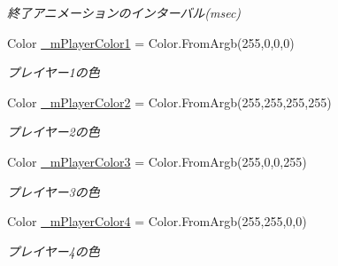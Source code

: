 \begin{DoxyCompactItemize}
\begin{DoxyCompactList}\small\item\em 終了アニメーションのインターバル(msec) \end{DoxyCompactList}\item 
\mbox{\label{class_reversi4color_wpf_1_1_reversi_setting_ab939e1084da7af7ae0db833db4be1ecd}} 
Color \hyperlink{class_reversi4color_wpf_1_1_reversi_setting_ab939e1084da7af7ae0db833db4be1ecd}{\+\_\+m\+Player\+Color1} = Color.\+From\+Argb(255,0,0,0)
\begin{DoxyCompactList}\small\item\em プレイヤー1の色 \end{DoxyCompactList}\item 
\mbox{\label{class_reversi4color_wpf_1_1_reversi_setting_ab56048d4d5e06451d7ae735c60fa3a64}} 
Color \hyperlink{class_reversi4color_wpf_1_1_reversi_setting_ab56048d4d5e06451d7ae735c60fa3a64}{\+\_\+m\+Player\+Color2} = Color.\+From\+Argb(255,255,255,255)
\begin{DoxyCompactList}\small\item\em プレイヤー2の色 \end{DoxyCompactList}\item 
\mbox{\label{class_reversi4color_wpf_1_1_reversi_setting_a1a6d1a59cbcd4193c86e83ca8e6e05e6}} 
Color \hyperlink{class_reversi4color_wpf_1_1_reversi_setting_a1a6d1a59cbcd4193c86e83ca8e6e05e6}{\+\_\+m\+Player\+Color3} = Color.\+From\+Argb(255,0,0,255)
\begin{DoxyCompactList}\small\item\em プレイヤー3の色 \end{DoxyCompactList}\item 
\mbox{\label{class_reversi4color_wpf_1_1_reversi_setting_a096df8f77572a4acbe165a87d61cd5a9}} 
Color \hyperlink{class_reversi4color_wpf_1_1_reversi_setting_a096df8f77572a4acbe165a87d61cd5a9}{\+\_\+m\+Player\+Color4} = Color.\+From\+Argb(255,255,0,0)
\begin{DoxyCompactList}\small\item\em プレイヤー4の色 \end{DoxyCompactList}\item 
\mbox{\label{class_reversi4color_wpf_1_1_reversi_setting_a98f04cb8228e776c7fb1dc12b1c504e0}} 

\end{DoxyCompactItemize}
